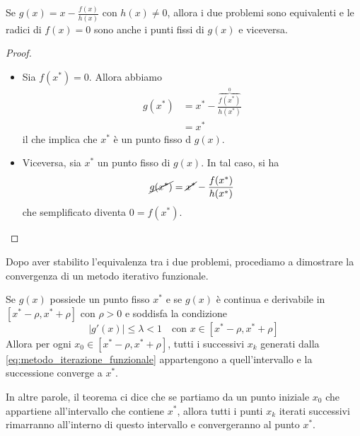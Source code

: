 \documentclass{article}
\begin{document}
Se $g(x)=x-\frac{f(x)}{h(x)}$ con $h(x)\neq0$, allora i due problemi sono
equivalenti e le radici di $f(x)=0$ sono anche i punti fissi di $g(x)$ e
viceversa.
\begin{proof}\leavevmode\
    \begin{itemize}
        \item Sia $f(x^*)=0$. Allora abbiamo
            \begin{equation*}
               \begin{aligned}
                   g(x^*)&=x^*-\frac{\overbrace{f(x^*)}^0}{h(x^*)}\\ 
                         &=x^*
               \end{aligned} 
            \end{equation*}
            il che implica che $x^*$ è un punto fisso d $g(x)$.
        \item Viceversa, sia $x^*$ un punto fisso di $g(x)$. In tal caso, si
            ha 
            $$\cancel{g(x^*)}=\cancel{x^*}-\frac{f(x^*)}{h(x^*)}$$
            che semplificato diventa $0=f(x^*)$.
    \end{itemize}
\end{proof}
Dopo aver stabilito l'equivalenza tra i due problemi, procediamo a dimostrare
la convergenza di un metodo iterativo funzionale.
\begin{theorem}
   Se $g(x)$ possiede un punto fisso $x^*$ e se $g(x)$ è continua e derivabile
   in $[x^*-\rho,x^*+\rho]$ con $\rho>0$ e soddisfa la condizione 
   $$\left\lvert g'(x)\right\rvert\leq \lambda<1\quad \text{con
   }x\in[x^*-\rho,x^*+\rho]$$
   Allora per ogni $x_0\in[x^*-\rho,x^*+\rho]$, tutti i successivi $x_k$
   generati dalla \ref{eq:metodo_iterazione_funzionale} appartengono 
   a quell'intervallo e la successione converge a $x^*$.
\end{theorem}
In altre parole, il teorema ci dice che se partiamo da un punto iniziale $x_0$
che appartiene all'intervallo che contiene $x^*$, allora tutti i punti $x_k$
iterati successivi rimarranno all'interno di questo intervallo e convergeranno
al punto $x^*$.
\end{document}

